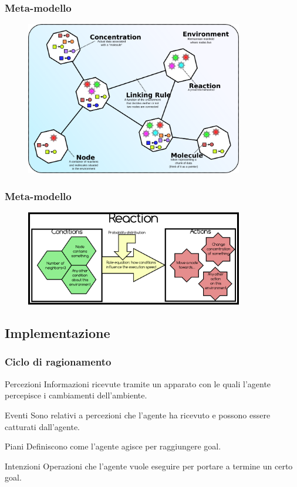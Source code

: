 \documentclass[handout]{beamer}\mode<presentation>{\usetheme{AMSCesenaBleu}}
\begin{document}
\begin{frame}
\frametitle{Meta-modello}
\begin{figure}
\includegraphics[width=9.5cm]{images/alchemistModel.png}
\end{figure}
\end{frame}

\begin{frame}
\frametitle{Meta-modello}
\begin{figure}
\includegraphics[width=9.5cm]{images/alchemistReaction.png}
\end{figure}
\end{frame}

\subsection{Implementazione}
\begin{frame}
\frametitle{Ciclo di ragionamento}
\begin{block}{Percezioni}
Informazioni ricevute tramite un apparato con le quali l'agente percepisce i cambiamenti dell'ambiente.
\end{block}

\begin{block}{Eventi}
Sono relativi a percezioni che l'agente ha ricevuto e possono essere catturati dall'agente.
\end{block}

\begin{block}{Piani}
Definiscono come l'agente agisce per raggiungere goal.
\end{block}

\begin{block}{Intenzioni}
Operazioni che l'agente vuole eseguire per portare a termine un certo goal.
\end{block}
\end{frame}
\end{document}
